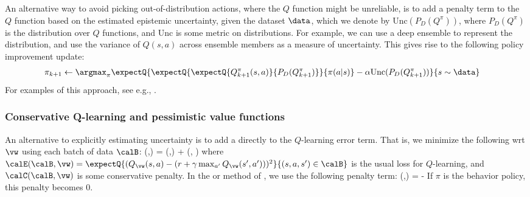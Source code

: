 An alternative way to avoid picking out-of-distribution actions,
where the $Q$ function might be unreliable,
is to add a penalty term to the $Q$ function based on the estimated
epistemic uncertainty, given the dataset $\data$,
which we denote by $\text{Unc}(P_D(Q^{\pi}))$,
where $P_D(Q^{\pi})$ is the distribution over $Q$ functions,
and $\text{Unc}$ is some metric on distributions.
For example, we can use a deep ensemble to represent the distribution,
and use the variance of $Q(s,a)$ across ensemble members as
a measure of uncertainty.
This gives rise to the following policy improvement update:
\begin{align}
  \pi_{k+1} &\leftarrow \argmax_{\pi} \expectQ{
    \expectQ{
      \expectQ{Q^{\pi}_{k+1}(s,a)}{P_D(Q_{k+1}^{\pi})}
    }{\pi(a|s)}
    - \alpha \text{Unc}(P_D(Q_{k+1}^{\pi}))
}{s \sim \data}
\end{align}
For examples of this approach, see e.g.,
\citep{An2021,Wu2021unc,Ghasemipour2022}.

\subsubsection{Conservative Q-learning and pessimistic value functions}
\label{sec:CQL}


An alternative to explicitly estimating uncertainty
is to add a 
directly to the $Q$-learning error term.
That is, we minimize the following wrt $\vw$
using each batch of data $\calB$:
\be
\overline{\calE}(\calB,\vw)
   = \alpha \calC(\calB,\vw) + \calE(\calB, \vw)
\ee
where $\calE(\calB, \vw) = \expectQ{ (Q_{\vw}(s,a) -
  (r+\gamma \max_{a'} Q_{\vw}(s',a')))^2}{(s,a,s') \in \calB}$
is the usual loss for $Q$-learning,
and $\calC(\calB,\vw)$ is some conservative penalty.
In the 
or  method of \citep{CQL},
we use the following penalty term:
\be
\calC(\calB,\vw)
= 
- 
\ee
If $\pi$ is the behavior policy, this penalty becomes 0.

